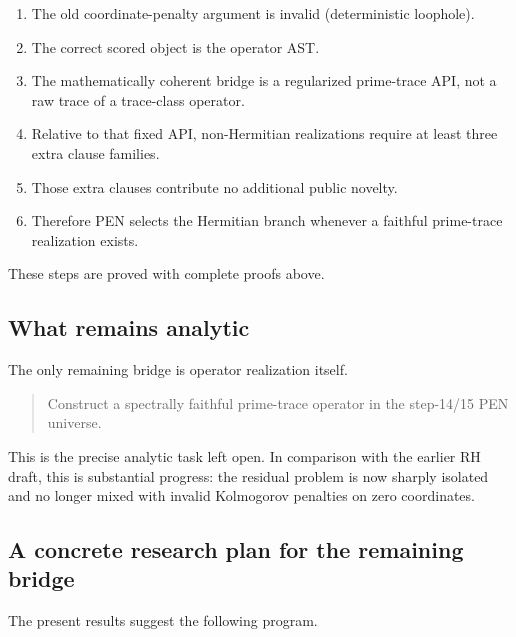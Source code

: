 \documentclass[11pt,a4paper]{article}
\theoremstyle{plain}
\theoremstyle{definition}
\theoremstyle{remark}
\begin{document}
\begin{enumerate}[leftmargin=2em]
  \item The old coordinate-penalty argument is invalid (deterministic loophole).
  \item The correct scored object is the operator AST.
  \item The mathematically coherent bridge is a regularized prime-trace API, not a raw trace of a trace-class operator.
  \item Relative to that fixed API, non-Hermitian realizations require at least three extra clause families.
  \item Those extra clauses contribute no additional public novelty.
  \item Therefore PEN selects the Hermitian branch whenever a faithful prime-trace realization exists.
\end{enumerate}

These steps are proved with complete proofs above.

\subsection{What remains analytic}

The only remaining bridge is operator realization itself.

\begin{quote}
Construct a spectrally faithful prime-trace operator in the step-14/15 PEN universe.
\end{quote}

This is the precise analytic task left open. In comparison with the earlier RH draft, this is substantial progress: the residual problem is now sharply isolated and no longer mixed with invalid Kolmogorov penalties on zero coordinates.

\subsection{A concrete research plan for the remaining bridge}

The present results suggest the following program.
\end{document}
